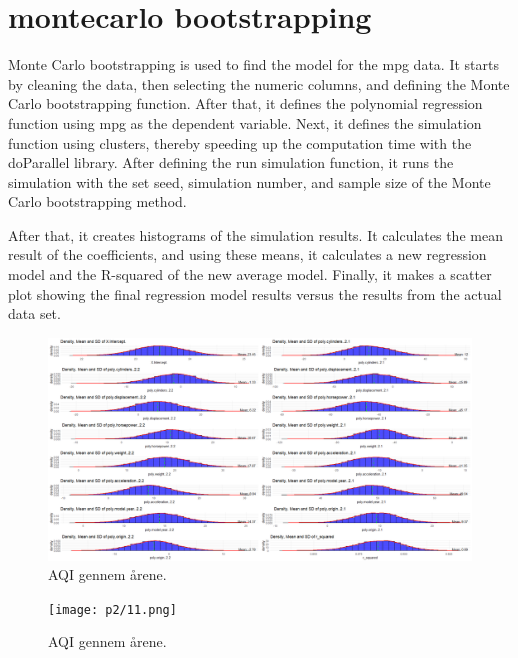 


\section{montecarlo bootstrapping }

Monte Carlo bootstrapping is used to find the model for the mpg data. It starts by cleaning the data, then selecting the numeric columns, and defining the Monte Carlo bootstrapping function. After that, it defines the polynomial regression function using mpg as the dependent variable. Next, it defines the simulation function using clusters, thereby speeding up the computation time with the doParallel library. After defining the run simulation function, it runs the simulation with the set seed, simulation number, and sample size of the Monte Carlo bootstrapping method.

After that, it creates histograms of the simulation results. It calculates the mean result of the coefficients, and using these means, it calculates a new regression model and the R-squared of the new average model. Finally, it makes a scatter plot showing the final regression model results versus the results from the actual data set.


\begin{figure}[h] 
	\centering
	\includegraphics[width=14cm]{p2/10.png}
	\caption{AQI gennem årene.}
	\label{fig:j06}
\end{figure}
\begin{figure}[h] 
	\centering
	\texttt{[image: p2/11.png]}
	\caption{AQI gennem årene.}
	\label{fig:j06}
\end{figure}